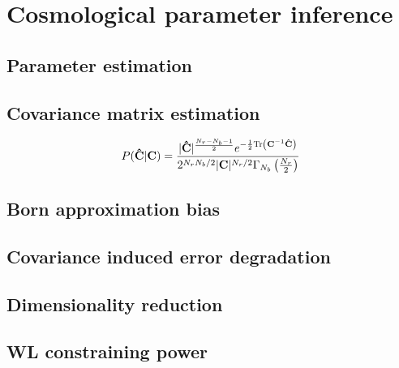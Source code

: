 
\chapter{Cosmological parameter inference}
\lhead[\fancyplain{}{\thepage}]{\fancyplain{}{\rightmark}}
 \thispagestyle{plain}
\setlength{\parindent}{10mm}
\label{chp:5}


\section{Parameter estimation}

\section{Covariance matrix estimation}

\begin{equation}
\label{eq:5:wishart-pdf}
P(\mathbf{\hat{C}}\vert \mathbf{C}) = \frac{\vert\mathbf{\hat{C}}\vert^{\frac{N_r-N_b-1}{2}}e^{-\frac{1}{2}{\rm Tr}\left(\mathbf{C}^{-1}\mathbf{\hat{C}}\right)}}{2^{N_rN_b/2}\vert \mathbf{C}\vert^{N_r/2}\Gamma_{N_b}\left(\frac{N_r}{2}\right)}
\end{equation}

\section{Born approximation bias}

\section{Covariance induced error degradation}

\section{Dimensionality reduction}

\section{WL constraining power}

%